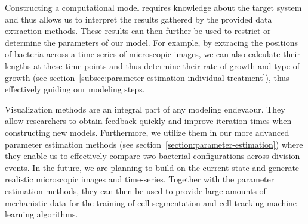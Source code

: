 \documentclass{article}
\begin{document}
Constructing a computational model requires knowledge about the target system and thus allows us to
interpret the results gathered by the provided data extraction methods.
These results can then further be used to restrict or determine the parameters of our model.
For example, by extracing the positions of bacteria across a time-series of microscopic images, we
can also calculate their lengths at these time-points and thus determine their rate of growth and
type of growth (see section~\ref{subsec:parameter-estimation-individual-treatment}), thus
effectively guiding our modeling steps.

Visualization methods are an integral part of any modeling endevaour.
They allow researchers to obtain feedback quickly and improve iteration times when constructing new
models.
Furthermore, we utilize them in our more advanced parameter estimation methods (see
section~\ref{section:parameter-estimation}) where they enable us to effectively compare
two bacterial configurations across division events.
In the future, we are planning to build on the current state and generate realistic microscopic
images and time-series.
Together with the parameter estimation methods, they can then be used to provide large amounts of
mechanistic data for the training of cell-segmentation and cell-tracking machine-learning
algorithms.
\end{document}
